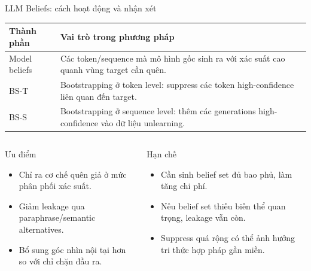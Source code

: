 \documentclass[t, aspectratio=169]{beamer}
\newcommand{\rowrule}{\midrule[0.25pt]}
\begin{document}
\begin{frame}{LLM Beliefs: cách hoạt động và nhận xét}
  \scriptsize
  \begin{tabularx}{\textwidth}{l Y}
    \toprule
    \textbf{Thành phần} & \textbf{Vai trò trong phương pháp} \\
    \midrule
    Model beliefs & Các token/sequence mà mô hình gốc sinh ra với xác suất cao quanh vùng target cần quên. \\
    \rowrule
    BS-T & Bootstrapping ở token level: suppress các token high-confidence liên quan đến target. \\
    \rowrule
    BS-S & Bootstrapping ở sequence level: thêm các generations high-confidence vào dữ liệu unlearning. \\
    \bottomrule
  \end{tabularx}

  \vspace{0.45em}
  \begin{columns}[T]
    \begin{column}{0.48\textwidth}
      \begin{block}{Ưu điểm}
        \begin{itemize}
          \item Chỉ ra cơ chế quên giả ở mức phân phối xác suất.
          \item Giảm leakage qua paraphrase/semantic alternatives.
          \item Bổ sung góc nhìn nội tại hơn so với chỉ chặn đầu ra.
        \end{itemize}
      \end{block}
    \end{column}
    \begin{column}{0.48\textwidth}
      \begin{alertblock}{Hạn chế}
        \begin{itemize}
          \item Cần sinh belief set đủ bao phủ, làm tăng chi phí.
          \item Nếu belief set thiếu biến thể quan trọng, leakage vẫn còn.
          \item Suppress quá rộng có thể ảnh hưởng tri thức hợp pháp gần miền.
        \end{itemize}
      \end{alertblock}
    \end{column}
  \end{columns}
\end{frame}
\end{document}
